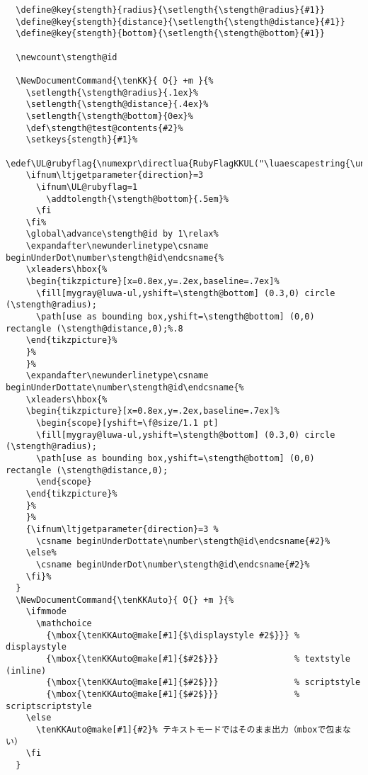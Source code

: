\documentclass[luatex,fontsize=8pt,paper=b5,twoside]{jlreq}%
\begin{document}
\begin{lstlisting}
  \define@key{stength}{radius}{\setlength{\stength@radius}{#1}}
  \define@key{stength}{distance}{\setlength{\stength@distance}{#1}}
  \define@key{stength}{bottom}{\setlength{\stength@bottom}{#1}}

  \newcount\stength@id  

  \NewDocumentCommand{\tenKK}{ O{} +m }{%
    \setlength{\stength@radius}{.1ex}%
    \setlength{\stength@distance}{.4ex}%
    \setlength{\stength@bottom}{0ex}%
    \def\stength@test@contents{#2}%
    \setkeys{stength}{#1}%
    \edef\UL@rubyflag{\numexpr\directlua{RubyFlagKKUL("\luaescapestring{\unexpanded\expandafter{\stength@test@contents}}")}\relax}%
    \ifnum\ltjgetparameter{direction}=3
      \ifnum\UL@rubyflag=1
        \addtolength{\stength@bottom}{.5em}%
      \fi
    \fi%
    \global\advance\stength@id by 1\relax%
    \expandafter\newunderlinetype\csname beginUnderDot\number\stength@id\endcsname{%
    \xleaders\hbox{%
    \begin{tikzpicture}[x=0.8ex,y=.2ex,baseline=.7ex]%
      \fill[mygray@luwa-ul,yshift=\stength@bottom] (0.3,0) circle (\stength@radius);
      \path[use as bounding box,yshift=\stength@bottom] (0,0) rectangle (\stength@distance,0);%.8
    \end{tikzpicture}%
    }%
    }%
    \expandafter\newunderlinetype\csname beginUnderDottate\number\stength@id\endcsname{%
    \xleaders\hbox{%
    \begin{tikzpicture}[x=0.8ex,y=.2ex,baseline=.7ex]%
      \begin{scope}[yshift=\f@size/1.1 pt]
      \fill[mygray@luwa-ul,yshift=\stength@bottom] (0.3,0) circle (\stength@radius);
      \path[use as bounding box,yshift=\stength@bottom] (0,0) rectangle (\stength@distance,0);
      \end{scope}
    \end{tikzpicture}%
    }%
    }%
    {\ifnum\ltjgetparameter{direction}=3 %
      \csname beginUnderDottate\number\stength@id\endcsname{#2}%
    \else%
      \csname beginUnderDot\number\stength@id\endcsname{#2}%
    \fi}%
  }
  \NewDocumentCommand{\tenKKAuto}{ O{} +m }{%
    \ifmmode
      \mathchoice
        {\mbox{\tenKKAuto@make[#1]{$\displaystyle #2$}}} % displaystyle
        {\mbox{\tenKKAuto@make[#1]{$#2$}}}               % textstyle (inline)
        {\mbox{\tenKKAuto@make[#1]{$#2$}}}               % scriptstyle
        {\mbox{\tenKKAuto@make[#1]{$#2$}}}               % scriptscriptstyle
    \else
      \tenKKAuto@make[#1]{#2}% テキストモードではそのまま出力（mboxで包まない）
    \fi
  }


\end{lstlisting}
\end{document}
